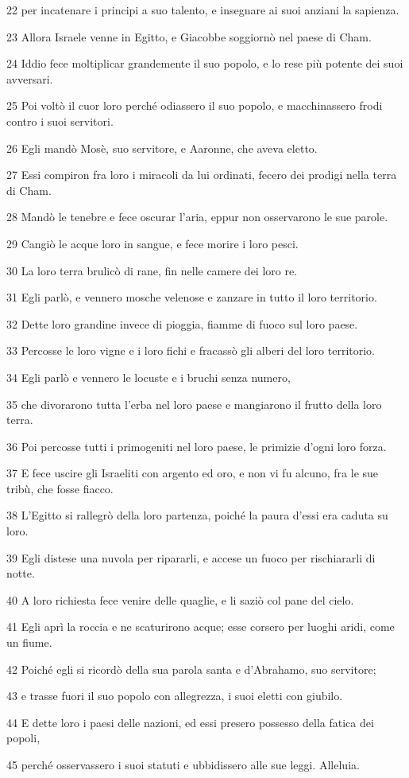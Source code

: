 \par 22 per incatenare i principi a suo talento, e insegnare ai suoi anziani la sapienza.
\par 23 Allora Israele venne in Egitto, e Giacobbe soggiornò nel paese di Cham.
\par 24 Iddio fece moltiplicar grandemente il suo popolo, e lo rese più potente dei suoi avversari.
\par 25 Poi voltò il cuor loro perché odiassero il suo popolo, e macchinassero frodi contro i suoi servitori.
\par 26 Egli mandò Mosè, suo servitore, e Aaronne, che aveva eletto.
\par 27 Essi compiron fra loro i miracoli da lui ordinati, fecero dei prodigi nella terra di Cham.
\par 28 Mandò le tenebre e fece oscurar l'aria, eppur non osservarono le sue parole.
\par 29 Cangiò le acque loro in sangue, e fece morire i loro pesci.
\par 30 La loro terra brulicò di rane, fin nelle camere dei loro re.
\par 31 Egli parlò, e vennero mosche velenose e zanzare in tutto il loro territorio.
\par 32 Dette loro grandine invece di pioggia, fiamme di fuoco sul loro paese.
\par 33 Percosse le loro vigne e i loro fichi e fracassò gli alberi del loro territorio.
\par 34 Egli parlò e vennero le locuste e i bruchi senza numero,
\par 35 che divorarono tutta l'erba nel loro paese e mangiarono il frutto della loro terra.
\par 36 Poi percosse tutti i primogeniti nel loro paese, le primizie d'ogni loro forza.
\par 37 E fece uscire gli Israeliti con argento ed oro, e non vi fu alcuno, fra le sue tribù, che fosse fiacco.
\par 38 L'Egitto si rallegrò della loro partenza, poiché la paura d'essi era caduta su loro.
\par 39 Egli distese una nuvola per ripararli, e accese un fuoco per rischiararli di notte.
\par 40 A loro richiesta fece venire delle quaglie, e li saziò col pane del cielo.
\par 41 Egli aprì la roccia e ne scaturirono acque; esse corsero per luoghi aridi, come un fiume.
\par 42 Poiché egli si ricordò della sua parola santa e d'Abrahamo, suo servitore;
\par 43 e trasse fuori il suo popolo con allegrezza, i suoi eletti con giubilo.
\par 44 E dette loro i paesi delle nazioni, ed essi presero possesso della fatica dei popoli,
\par 45 perché osservassero i suoi statuti e ubbidissero alle sue leggi. Alleluia.


